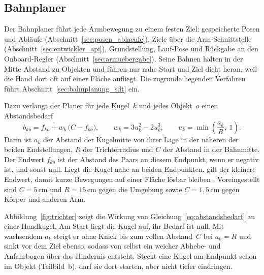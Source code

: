 \subsection{Bahnplaner}
\label{sec:bahnplaner}

Der Bahnplaner führt jede Armbewegung zu einem festen Ziel: gespeicherte Posen und Abläufe (Abschnitt~\ref{sec:posen_ablaeufe}), Ziele über die Arm-Schnittstelle (Abschnitt~\ref{sec:entwickler_api}), Grundstellung, Lauf-Pose und Rückgabe an den Onboard-Regler (Abschnitt~\ref{sec:armuebergabe}).
Seine Bahnen halten in der Mitte Abstand zu Objekten und führen nur nahe Start und Ziel dicht heran, weil die Hand dort oft auf einer Fläche aufliegt.
Die zugrunde liegenden Verfahren führt Abschnitt~\ref{sec:bahnplanung_sdt} ein.

Dazu verlangt der Planer für jede Kugel~$k$ und jedes Objekt~$o$ einen Abstandsbedarf
\begin{equation}
  b_{ko} = f_{ko} + w_k\,\bigl(C - f_{ko}\bigr), \qquad
  w_k = 3u_k^2 - 2u_k^3, \qquad
  u_k = \min\left(\frac{a_k}{R},\ 1\right).
  \label{eq:abstandsbedarf}
\end{equation}
%
Darin ist $a_k$ der Abstand der Kugelmitte von ihrer Lage in der näheren der beiden Endstellungen, $R$ der Trichterradius und $C$ der Abstand in der Bahnmitte.
Der Endwert $f_{ko}$ ist der Abstand des Paars an diesem Endpunkt, wenn er negativ ist, und sonst null.
Liegt die Kugel nahe an beiden Endpunkten, gilt der kleinere Endwert, damit kurze Bewegungen auf einer Fläche lösbar bleiben .
Voreingestellt sind $C = 5$\,cm und $R = 15$\,cm gegen die Umgebung sowie $C = 1{,}5$\,cm gegen Körper und anderen Arm.

Abbildung~\ref{fig:trichter} zeigt die Wirkung von Gleichung~\ref{eq:abstandsbedarf} an einer Handkugel.
Am Start liegt die Kugel auf, ihr Bedarf ist null.
Mit wachsendem $a_k$ steigt er ohne Knick bis zum vollen Abstand~$C$ bei $a_k = R$ und sinkt vor dem Ziel ebenso, sodass von selbst ein weicher Abhebe- und Anfahrbogen über das Hindernis entsteht.
Steckt eine Kugel am Endpunkt schon im Objekt (Teilbild~b), darf sie dort starten, aber nicht tiefer eindringen.

